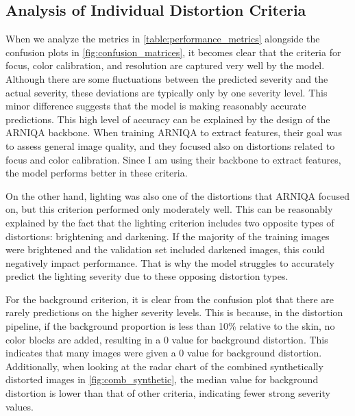 \subsection{Analysis of Individual Distortion Criteria}
\label{subsec:AnalysisDistortionCriteria}
When we analyze the metrics in \autoref{table:performance_metrics} alongside the confusion plots in \autoref{fig:confusion_matrices}, it becomes clear that the criteria for focus, color calibration, and resolution are captured very well by the model. Although there are some fluctuations between the predicted severity and the actual severity, these deviations are typically only by one severity level. This minor difference suggests that the model is making reasonably accurate predictions. This high level of accuracy can be explained by the design of the ARNIQA backbone. When training ARNIQA to extract features, their goal was to assess general image quality, and they focused also on distortions related to focus and color calibration. Since I am using their backbone to extract features, the model performs better in these criteria.\par
\vspace{\baselineskip}
\noindent
On the other hand, lighting was also one of the distortions that ARNIQA focused on, but this criterion performed only moderately well. This can be reasonably explained by the fact that the lighting criterion includes two opposite types of distortions: brightening and darkening. If the majority of the training images were brightened and the validation set included darkened images, this could negatively impact performance. That is why the model struggles to accurately predict the lighting severity due to these opposing distortion types.\par
\vspace{\baselineskip}
\noindent
For the background criterion, it is clear from the confusion plot that there are rarely predictions on the higher severity levels. This is because, in the distortion pipeline, if the background proportion is less than 10\% relative to the skin, no color blocks are added, resulting in a 0 value for background distortion. This indicates that many images were given a 0 value for background distortion. Additionally, when looking at the radar chart of the combined synthetically distorted images in \autoref{fig:comb_synthetic}, the median value for background distortion is lower than that of other criteria, indicating fewer strong severity values. \par

